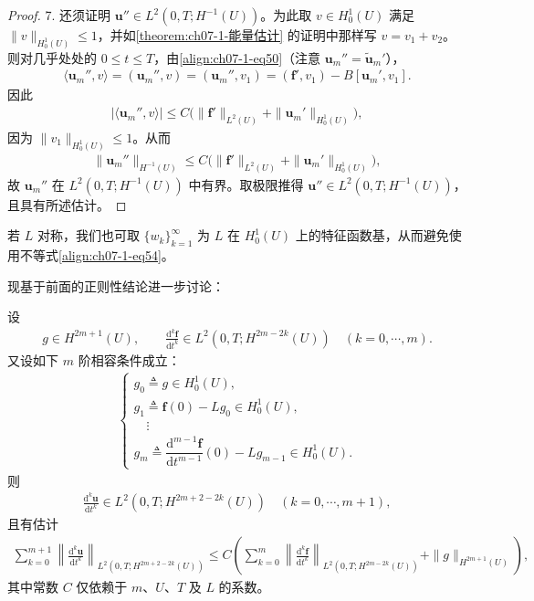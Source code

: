 \documentclass[../../main.tex]{subfiles}
\begin{document}
\begin{proof}
7. 还须证明 $\mathbf{u}''\in L^2(0,T;H^{-1}(U))$。为此取 $v\in H^1_0(U)$ 满足 $\|v\|_{H^1_0(U)}\leqslant 1$，并如\cref{theorem:ch07-1-能量估计} 的证明中那样写 $v=v_1+v_2$。则对几乎处处的 $0\leqslant t\leqslant T$，由\eqref{align:ch07-1-eq50}（注意 $\mathbf{u}_m''=\widetilde{\mathbf{u}}_m'$），
\begin{align*}
\langle\mathbf{u}_m'',v\rangle = (\mathbf{u}_m'',v) = (\mathbf{u}_m'',v_1) = (\mathbf{f}',v_1)-B[\mathbf{u}_m',v_1].
\end{align*}
因此
\begin{align*}
|\langle\mathbf{u}_m'',v\rangle| \leqslant C\bigl(\|\mathbf{f}'\|_{L^2(U)}+\|\mathbf{u}_m'\|_{H^1_0(U)}\bigr),
\end{align*}
因为 $\|v_1\|_{H^1_0(U)}\leqslant 1$。从而
\begin{align*}
\|\mathbf{u}_m''\|_{H^{-1}(U)} \leqslant C\bigl(\|\mathbf{f}'\|_{L^2(U)}+\|\mathbf{u}_m'\|_{H^1_0(U)}\bigr),
\end{align*}
故 $\mathbf{u}_m''$ 在 $L^2(0,T;H^{-1}(U))$ 中有界。取极限推得 $\mathbf{u}''\in L^2(0,T;H^{-1}(U))$，且具有所述估计。
\end{proof}

\begin{remark}\label{remark:ch07-1-对称算子可免不等式54}
若 $L$ 对称，我们也可取 $\{w_k\}_{k=1}^\infty$ 为 $L$ 在 $H^1_0(U)$ 上的特征函数基，从而避免使用不等式\eqref{align:ch07-1-eq54}。
\end{remark}

现基于前面的正则性结论进一步讨论：

\begin{theorem}[更高的正则性。]\label{theorem:ch07-1-高阶正则性}设
\begin{align*}
g\in H^{2m+1}(U),\qquad \frac{\mathrm{d}^k\mathbf{f}}{\mathrm{d}t^k}\in L^2(0,T;H^{2m-2k}(U))\quad (k=0,\cdots,m).
\end{align*}
又设如下 $m$ 阶相容条件成立：
\begin{align*}
\begin{cases}
g_0\triangleq g\in H^1_0(U),\\
g_1\triangleq \mathbf{f}(0)-Lg_0\in H^1_0(U),\\
\quad\vdots\\
g_m\triangleq \dfrac{\mathrm{d}^{m-1}\mathbf{f}}{\mathrm{d}t^{m-1}}(0)-Lg_{m-1}\in H^1_0(U).
\end{cases}
\end{align*}
则
\begin{align*}
\frac{\mathrm{d}^k\mathbf{u}}{\mathrm{d}t^k}\in L^2(0,T;H^{2m+2-2k}(U))\quad (k=0,\cdots,m+1),
\end{align*}
且有估计
\begin{align}
\sum_{k=0}^{m+1}\left\|\frac{\mathrm{d}^k\mathbf{u}}{\mathrm{d}t^k}\right\|_{L^2(0,T;H^{2m+2-2k}(U))}
\leqslant C\left(\sum_{k=0}^m\left\|\frac{\mathrm{d}^k\mathbf{f}}{\mathrm{d}t^k}\right\|_{L^2(0,T;H^{2m-2k}(U))}+\|g\|_{H^{2m+1}(U)}\right),\label{align:ch07-1-eq55}
\end{align}
其中常数 $C$ 仅依赖于 $m$、$U$、$T$ 及 $L$ 的系数。
\end{theorem}
\end{document}
